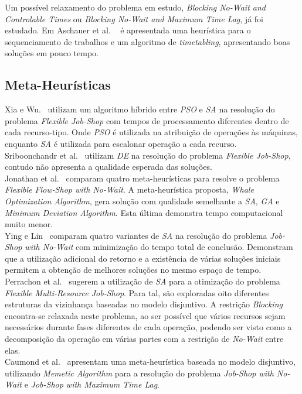 Um possível relaxamento do problema em estudo, \textit{Blocking No-Wait and Controlable Times} ou \textit{Blocking No-Wait and Maximum Time Lag}, já foi estudado. Em Aschauer et al. ~\cite{aschauerEfficientAlgorithmScheduling2017} é apresentada uma heurística para o sequenciamento de trabalhos e um algoritmo de \textit{timetabling}, apresentando boas soluções em pouco tempo.\\ 

\subsection{Meta-Heurísticas}

Xia e Wu.~\cite{xiaEffectiveHybridOptimization2005} utilizam um algoritmo híbrido entre \textit{PSO} e \textit{SA} na resolução do problema \textit{Flexible Job-Shop} com tempos de processamento diferentes dentro de cada recurso-tipo. Onde \textit{PSO} é utilizada na atribuição de operações às máquinas, enquanto \textit{SA} é utilizada para escalonar operação a cada recurso.\\

Sriboonchandr et al.~\cite{sriboonchandrImprovedDifferentialEvolution2019} utilizam \textit{DE} na resolução do problema \textit{Flexible Job-Shop}, contudo não apresenta a qualidade esperada das soluções.\\

Jonathan et al.~\cite{jonathanWhaleOptimizationAlgorithm2024} comparam quatro meta-heurísticas para resolve o problema \textit{Flexible Flow-Shop with No-Wait}. A meta-heurística proposta, \textit{Whale Optimization Algorithm}, gera solução com qualidade semelhante a \textit{SA}, \textit{GA} e \textit{Minimum Deviation Algorithm}. Esta última demonstra tempo computacional muito menor.\\

Ying e Lin~\cite{yingMinimizingTotalCompletion2022} comparam quatro variantes de \textit{SA} na resolução do problema \textit{Job-Shop with No-Wait} com minimização do tempo total de conclusão. Demonstram que a utilização adicional do retorno e a existência de várias soluções iniciais permitem a obtenção de melhores soluções no mesmo espaço de tempo.\\

Perrachon et al.~\cite{perrachonIndustrialMultiresourceFlexible2025} sugerem a utilização de \textit{SA} para a otimização do problema \textit{Flexible Multi-Resource Job-Shop}. Para tal, são exploradas oito diferentes estruturas da vizinhança baseadas no modelo disjuntivo. A restrição \textit{Blocking} encontra-se relaxada neste problema, ao ser possível que vários recursos sejam necessários durante fases diferentes de cada operação, podendo ser visto como a decomposição da operação em várias partes com a restrição de \textit{No-Wait} entre elas.\\

Caumond et al.~\cite{caumondMemeticAlgorithmJobshop2008} apresentam uma meta-heurística baseada no modelo disjuntivo, utilizando \textit{Memetic Algorithm} para a resolução do problema \textit{Job-Shop with No-Wait} e \textit{Job-Shop with Maximum Time Lag}.\\